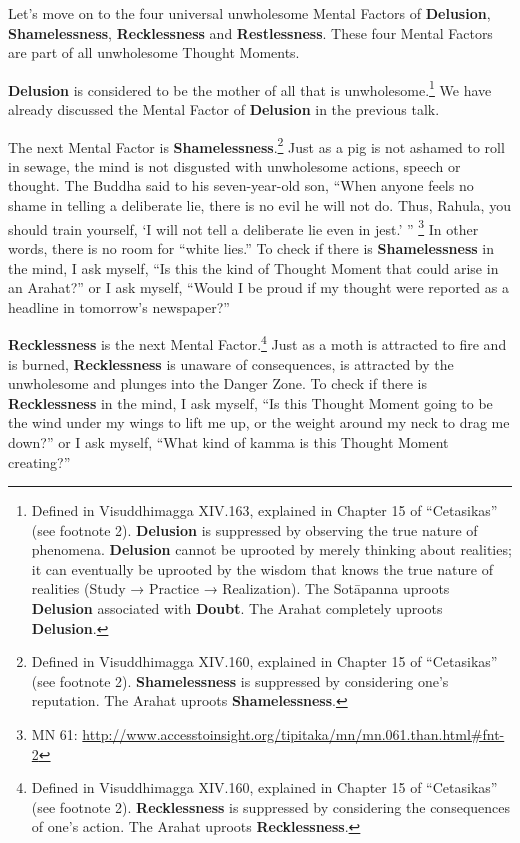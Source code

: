 Let’s move on to the four universal unwholesome Mental Factors of \textbf{Delusion}, \textbf{Shamelessness}, \textbf{Recklessness} and \textbf{Restlessness}. These four Mental Factors are part of all unwholesome Thought Moments.

\textbf{Delusion} is considered to be the mother of all that is unwholesome.\footnote{Defined in Visuddhimagga XIV.163, explained in Chapter 15 of “Cetasikas” (see footnote 2). \textbf{Delusion} is suppressed by observing the true nature of phenomena. \textbf{Delusion} cannot be uprooted by merely thinking about realities; it can eventually be uprooted by the wisdom that knows the true nature of realities (Study → Practice → Realization). The Sotāpanna uproots \textbf{Delusion} associated with \textbf{Doubt}. The Arahat completely uproots \textbf{Delusion}.} We have already discussed the Mental Factor of \textbf{Delusion} in the previous talk.

The next Mental Factor is \textbf{Shamelessness}.\footnote{Defined in Visuddhimagga XIV.160, explained in Chapter 15 of “Cetasikas” (see footnote 2). \textbf{Shamelessness} is suppressed by considering one’s reputation. The Arahat uproots \textbf{Shamelessness}.} Just as a pig is not ashamed to roll in sewage, the mind is not disgusted with unwholesome actions, speech or thought. The Buddha said to his seven-year-old son, “When anyone feels no shame in telling a deliberate lie, there is no evil he will not do. Thus, Rahula, you should train yourself, `I will not tell a deliberate lie even in jest.’ ” \footnote{MN 61: \url{http://www.accesstoinsight.org/tipitaka/mn/mn.061.than.html\#fnt-2}} In other words, there is no room for “white lies.” To check if there is \textbf{Shamelessness} in the mind, I ask myself, “Is this the kind of Thought Moment that could arise in an Arahat?” or I ask myself, “Would I be proud if my thought were reported as a headline in tomorrow’s newspaper?”

\textbf{Recklessness} is the next Mental Factor.\footnote{Defined in Visuddhimagga XIV.160, explained in Chapter 15 of “Cetasikas” (see footnote 2). \textbf{Recklessness} is suppressed by considering the consequences of one’s action. The Arahat uproots \textbf{Recklessness}.} Just as a moth is attracted to fire and is burned, \textbf{Recklessness} is unaware of consequences, is attracted by the unwholesome and plunges into the Danger Zone. To check if there is \textbf{Recklessness} in the mind, I ask myself, “Is this Thought Moment going to be the wind under my wings to lift me up, or the weight around my neck to drag me down?” or I ask myself, “What kind of kamma is this Thought Moment creating?”


